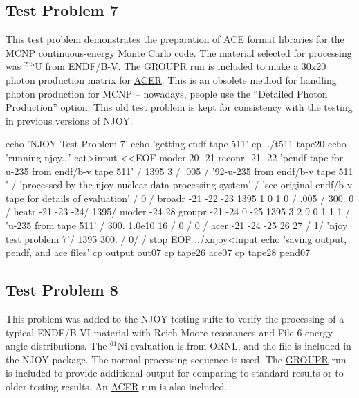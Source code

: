 \subsection{Test Problem 7}
\label{ssMandT_7}

This test problem demonstrates the preparation of
ACE format libraries for the MCNP
continuous-energy Monte Carlo code.  The
material selected for processing was $^{235}$U from ENDF/B-V.
The \hyperlink{sGROUPRhy}{GROUPR} run is included to make a 30x20
photon production matrix for \hyperlink{sACERhy}{ACER}.  This is
an obsolete method for handling
photon production for MCNP -- nowadays, people use the
``Detailed Photon Production'' option.  This old test problem
is kept for consistency with the testing in previous versions
of NJOY.

\small
\begin{ccode}

echo 'NJOY Test Problem 7'
echo 'getting endf tape 511'
cp ../t511 tape20
echo 'running njoy...'
cat>input <<EOF
 moder
 20 -21
 reconr
 -21 -22
 'pendf tape for u-235 from endf/b-v tape 511' /
 1395 3 /
 .005 /
 '92-u-235 from endf/b-v tape 511 ' /
 'processed by the njoy nuclear data processing system' /
 'see original endf/b-v tape for details of evaluation' /
 0 /
 broadr
 -21 -22 -23
 1395 1 0 1 0 /
 .005 /
 300.
 0 /
 heatr
 -21 -23 -24/
 1395/
 moder
 -24 28
 groupr
 -21 -24 0 -25
 1395 3 2 9 0 1 1 1 /
 'u-235 from tape 511' /
 300.
 1.0e10
 16 /
 0 /
 0 /
 acer
 -21 -24 -25 26 27 /
 1/
 'njoy test problem 7'/
 1395 300. /
 0/
 /
 stop
EOF
../xnjoy<input
echo 'saving output, pendf, and ace files'
cp output out07
cp tape26 ace07
cp tape28 pend07

\end{ccode}
\normalsize

\subsection{Test Problem 8}
\label{ssMandT_8}

This problem was added to the NJOY testing suite to verify the
processing of a typical ENDF/B-VI material with Reich-Moore
resonances and File 6 energy-angle distributions.  The $^{61}$Ni
evaluation is from ORNL, and the file is included in the NJOY
package.  The normal processing sequence is used.  The
\hyperlink{sGROUPRhy}{GROUPR} run is included to provide
additional output for comparing to standard results or to older
testing results.  An \hyperlink{sACERhy}{ACER} run is also included.


